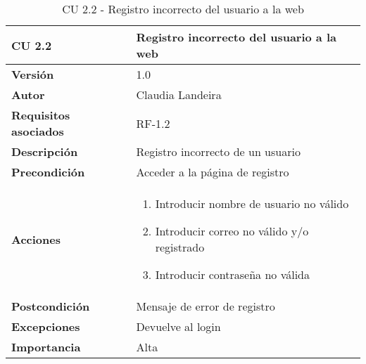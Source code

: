 \begin{table}[p]
	\centering
	\begin{tabularx}{\linewidth}{ p{} p{} }
		\toprule
		\textbf{CU 2.2}    & \textbf{Registro incorrecto del usuario a la web}\\
		\toprule
		\textbf{Versión}              & 1.0    \\
		\textbf{Autor}                & Claudia Landeira \\
		\textbf{Requisitos asociados} & RF-1.2\\
		\textbf{Descripción}          & Registro incorrecto de un usuario\\
		\textbf{Precondición}         & Acceder a la página de registro\\
		\textbf{Acciones}             &
		\begin{enumerate}
			\def\labelenumi{\arabic{enumi}.}
			\tightlist
                \item Introducir nombre de usuario no válido
			\item Introducir correo no válido y/o registrado
			\item Introducir contraseña no válida
		\end{enumerate}\\
		\textbf{Postcondición}        & Mensaje de error de registro \\
		\textbf{Excepciones}          & Devuelve al login \\
		\textbf{Importancia}          & Alta \\
		\bottomrule
	\end{tabularx}
	\caption{CU 2.2 - Registro incorrecto del usuario a la web}
\end{table}

